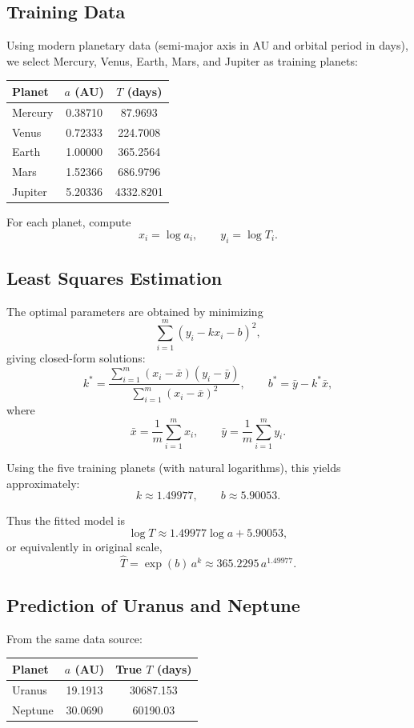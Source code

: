 \documentclass[11pt]{article}
\begin{document}
\subsection*{Training Data}

Using modern planetary data (semi-major axis in AU and orbital period in days), we select Mercury, Venus, Earth, Mars, and Jupiter as training planets:

\begin{center}
\begin{tabular}{lcc}
\hline
Planet & $a$ (AU) & $T$ (days)\\
\hline
Mercury & 0.38710 & 87.9693\\
Venus & 0.72333 & 224.7008\\
Earth & 1.00000 & 365.2564\\
Mars & 1.52366 & 686.9796\\
Jupiter & 5.20336 & 4332.8201\\
\hline
\end{tabular}
\end{center}

For each planet, compute
\[
x_i=\log a_i,\qquad y_i=\log T_i.
\]

\subsection*{Least Squares Estimation}

The optimal parameters are obtained by minimizing
\[
\sum_{i=1}^m (y_i - kx_i - b)^2,
\]
giving closed-form solutions:
\[
k^*=\frac{\sum_{i=1}^{m}(x_i-\bar x)(y_i-\bar y)}{\sum_{i=1}^{m}(x_i-\bar x)^2},
\qquad
b^*=\bar y-k^*\bar x,
\]
where
\[
\bar x=\frac{1}{m}\sum_{i=1}^m x_i,\qquad
\bar y=\frac{1}{m}\sum_{i=1}^m y_i.
\]

Using the five training planets (with natural logarithms), this yields approximately:
\[
k \approx 1.49977,\qquad b \approx 5.90053.
\]

Thus the fitted model is
\[
\log T \approx 1.49977\log a + 5.90053,
\]
or equivalently in original scale,
\[
\hat T = \exp(b)\, a^{k} \approx 365.2295\, a^{1.49977}.
\]

\subsection*{Prediction of Uranus and Neptune}

From the same data source:

\begin{center}
\begin{tabular}{lcc}
\hline
Planet & $a$ (AU) & True $T$ (days)\\
\hline
Uranus & 19.1913 & 30687.153\\
Neptune & 30.0690 & 60190.03\\
\hline
\end{tabular}
\end{center}
\end{document}
